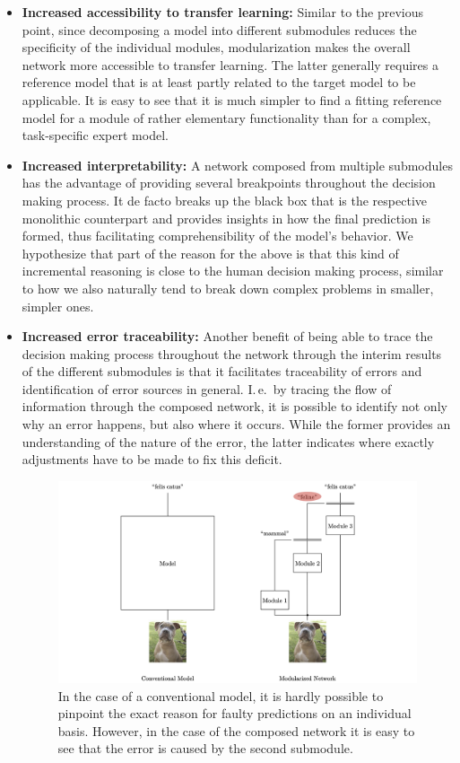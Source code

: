\begin{itemize}
    \item \textbf{Increased accessibility to transfer learning:} Similar to the previous point, since decomposing a model into different submodules reduces the specificity of the individual modules, modularization makes the overall network more accessible to transfer learning. The latter generally requires a reference model that is at least partly related to the target model to be applicable. It is easy to see that it is much simpler to find a fitting reference model for a module of rather elementary functionality than for a complex, task-specific expert model.
    \item \textbf{Increased interpretability:} A network composed from multiple submodules has the advantage of providing several breakpoints throughout the decision making process. It de facto breaks up the black box that is the respective monolithic counterpart and provides insights in how the final prediction is formed, thus facilitating comprehensibility of the model's behavior. We hypothesize that part of the reason for the above is that this kind of incremental reasoning is close to the human decision making process, similar to how we also naturally tend to break down complex problems in smaller, simpler ones.
    \item \textbf{Increased error traceability:} Another benefit of being able to trace the decision making process throughout the network through the interim results of the different submodules is that it facilitates traceability of errors and identification of error sources in general. I.\,e.\ by tracing the flow of information through the composed network, it is possible to identify not only why an error happens, but also where it occurs. While the former provides an understanding of the nature of the error, the latter indicates where exactly adjustments have to be made to fix this deficit.

\begin{figure}[b!]
    \centering
	    \includegraphics[width=\textwidth, trim=250 0 250 -50, clip]{thesis/graphics/graphics/error_traceability.jpeg}
    \caption{In the case of a conventional model, it is hardly possible to pinpoint the exact reason for faulty predictions on an individual basis. However, in the case of the composed network it is easy to see that the error is caused by the second submodule.}
    \label{fig:modularization_error_traceability}
\end{figure}
    

\end{itemize}
